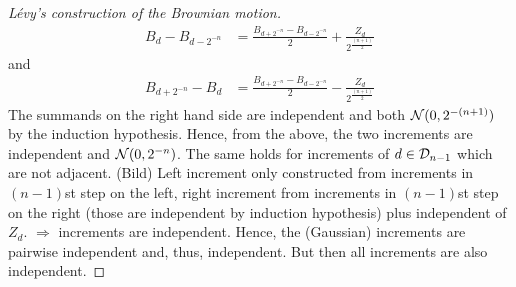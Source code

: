 \begin{proof}[L\'evy's construction of the Brownian motion]
				\begin{align*}
					B_d - B_{d-2^{-n}} &= \frac{B_{d+2^{-n}}-B_{d-2^{-n}}}{2} + \frac{Z_d}{2^{\frac{(n+1)}{2}}}
				\end{align*}
				and
				\begin{align*}
					B_{d+2^{-n}}- B_d &= \frac{B_{d+2^{-n}}-B_{d-2^{-n}}}{2} - \frac{Z_d}{2^{\frac{(n+1)}{2}}} 
				\end{align*}
				The summands on the right hand side are independent and both $\mathcal{N}(0,2^{-(n+1)})$ by the induction hypothesis. Hence, from the above, the two increments are independent and $\mathcal{N}(0,2^{-n})$.
				The same holds for increments of $d\in\mathcal{D}_{n-1}$ which are not adjacent. (Bild) Left increment only constructed from increments in $(n-1)$st step on the left, right increment from increments in $(n-1)$st step on the right (those are independent by induction hypothesis) plus independent of $Z_d$. $\Rightarrow$ increments are independent. Hence, the (Gaussian) increments are pairwise independent and, thus, independent. But then all increments are also independent.


\end{proof}
